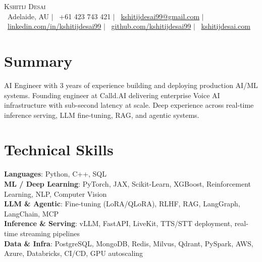 \documentclass[letterpaper,11pt]{article}
\begin{document}
\begin{center}
    {\Huge \scshape Kshitij Desai} \\ \vspace{4pt}
    \small
    \faMapMarker*\ Adelaide, AU $|$
    \faPhone\ +61 423 743 421 $|$
    \faEnvelope\ \href{mailto:kshitijdesai99@gmail.com}{kshitijdesai99@gmail.com} $|$
    \faLinkedin\ \href{https://www.linkedin.com/in/kshitijdesai99}{linkedin.com/in/kshitijdesai99} $|$
    \faGithub\ \href{https://github.com/kshitijdesai99}{github.com/kshitijdesai99} $|$
    \faGlobe\ \href{https://kshitijdesai.com}{kshitijdesai.com}
\end{center}

\section{Summary}
\small{
AI Engineer with 3 years of experience building and deploying production AI/ML systems. Founding engineer at Calld.AI delivering enterprise Voice AI infrastructure with sub-second latency at scale. Deep experience across real-time inference serving, LLM fine-tuning, RAG, and agentic systems.
}
\vspace{-4pt}

\section{Technical Skills}
\begin{itemize}[leftmargin=0.15in, label={}]
    \small{\item{
        \textbf{Languages}{: Python, C++, SQL} \\
        \textbf{ML / Deep Learning}{: PyTorch, JAX, Scikit-Learn, XGBoost, Reinforcement Learning, NLP, Computer Vision} \\
        \textbf{LLM \& Agentic}{: Fine-tuning (LoRA/QLoRA), RLHF, RAG, LangGraph, LangChain, MCP} \\
        \textbf{Inference \& Serving}{: vLLM, FastAPI, LiveKit, TTS/STT deployment, real-time streaming pipelines} \\
        \textbf{Data \& Infra}{: PostgreSQL, MongoDB, Redis, Milvus, Qdrant, PySpark, AWS, Azure, Databricks, CI/CD, GPU autoscaling} \\
    }}
\end{itemize}
\vspace{-4pt}

\end{document}
